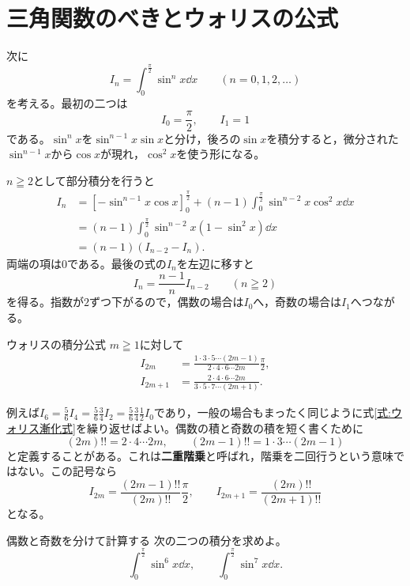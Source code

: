 \section{三角関数のべきとウォリスの公式}\label{節:ウォリス公式}

次に
\[
 I_n=\int_0^{\frac{\pi}{2}}\sin^n x\dd x
 \qquad(n=0,1,2,\ldots)
\]
を考える。最初の二つは
\[
 I_0=\frac{\pi}{2},\qquad I_1=1
\]
である。$\sin^n x$を$\sin^{n-1}x\sin x$と分け，後ろの$\sin x$を積分すると，微分された$\sin^{n-1}x$から$\cos x$が現れ，$\cos^2x$を使う形になる。

$n\geqq2$として部分積分を行うと
\begin{align*}
 I_n
 &=\left[-\sin^{n-1}x\cos x\right]_0^{\frac{\pi}{2}}
 +(n-1)\int_0^{\frac{\pi}{2}}\sin^{n-2}x\cos^2x\dd x\\
 &=(n-1)\int_0^{\frac{\pi}{2}}\sin^{n-2}x(1-\sin^2x)\dd x\\
 &=(n-1)(I_{n-2}-I_n).
\end{align*}
両端の項は$0$である。最後の式の$I_n$を左辺に移すと
\begin{equation}\label{式:ウォリス漸化式}
 I_n=\frac{n-1}{n}I_{n-2}\qquad(n\geqq2)
\end{equation}
を得る。指数が$2$ずつ下がるので，偶数の場合は$I_0$へ，奇数の場合は$I_1$へつながる。

\begin{theorem}{ウォリスの積分公式}
$m\geqq1$に対して
\begin{align}
 I_{2m}
 &=\frac{1\cdot3\cdot5\cdots(2m-1)}{2\cdot4\cdot6\cdots2m}
   \frac{\pi}{2},\label{式:ウォリス偶数}\\
 I_{2m+1}
 &=\frac{2\cdot4\cdot6\cdots2m}{3\cdot5\cdot7\cdots(2m+1)}.
 \label{式:ウォリス奇数}
\end{align}
\end{theorem}

例えば$I_6=\frac56I_4=\frac56\frac34I_2=\frac56\frac34\frac12I_0$であり，一般の場合もまったく同じように式\eqref{式:ウォリス漸化式}を繰り返せばよい。偶数の積と奇数の積を短く書くために
\[
 (2m)!!=2\cdot4\cdots2m,\qquad
 (2m-1)!!=1\cdot3\cdots(2m-1)
\]
と定義することがある。これは\textbf{二重階乗}と呼ばれ，階乗を二回行うという意味ではない。この記号なら
\[
 I_{2m}=\frac{(2m-1)!!}{(2m)!!}\frac{\pi}{2},\qquad
 I_{2m+1}=\frac{(2m)!!}{(2m+1)!!}
\]
となる。

\begin{example}{偶数と奇数を分けて計算する}
次の二つの積分を求めよ。
\[
 \int_0^{\frac{\pi}{2}}\sin^6x\dd x,\qquad
 \int_0^{\frac{\pi}{2}}\sin^7x\dd x.
\]
\end{example}

